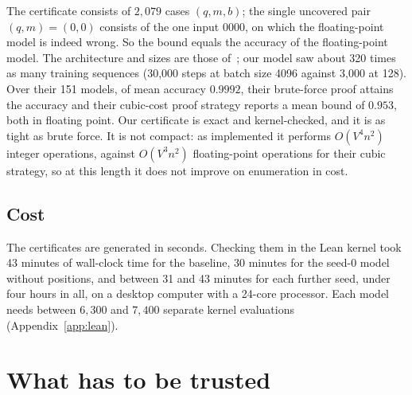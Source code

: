 \documentclass[11pt,a4paper]{article}
\begin{document}
The certificate consists of $2{,}079$ cases $(q,m,b)$; the single uncovered pair
$(q,m)=(0,0)$ consists of the one input $0000$, on which the floating-point
model is indeed wrong. So the bound equals the accuracy of the floating-point
model. The architecture and sizes are those of~\cite{gross2024compact}; our
model saw about 320 times as many training sequences (30{,}000 steps at batch
size 4096 against 3{,}000 at 128). Over their 151 models, of mean accuracy
$0.9992$, their brute-force proof attains the accuracy and their cubic-cost
proof strategy reports a mean bound of $0.953$, both in floating point. Our
certificate is exact and kernel-checked, and it is as tight as brute force. It
is not compact: as implemented it performs $O(V^4n^2)$ integer operations,
against $O(V^3n^2)$ floating-point operations for their cubic strategy, so at
this length it does not improve on enumeration in cost.

\subsection{Cost}

The certificates are generated in seconds. Checking them in the Lean kernel
took 43 minutes of wall-clock time for the baseline, 30 minutes for the seed-0
model without positions, and between 31 and 43 minutes for each further seed,
under four hours in all, on a desktop computer with a 24-core processor.
Each model needs between $6{,}300$ and $7{,}400$ separate kernel evaluations
(Appendix~\ref{app:lean}).

\section{What has to be trusted}\label{sec:trust}
\end{document}
